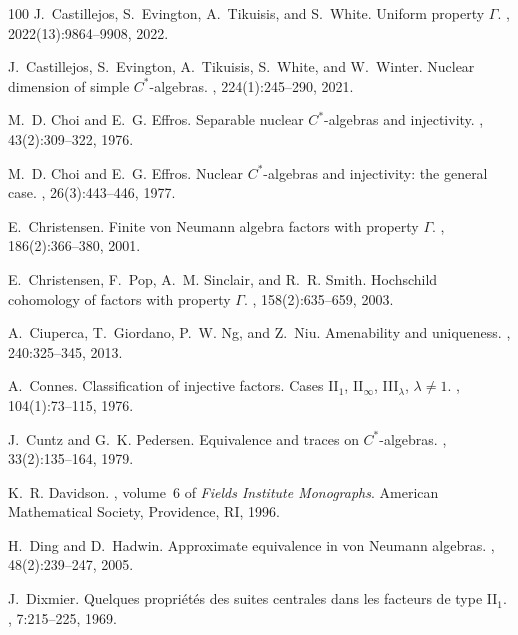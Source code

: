 \documentclass[a4paper,11pt]{amsart}
\theoremstyle{definition}
\numberwithin{equation}{section}
\numberwithin{theorem}{section}
\begin{document}
\begin{thebibliography}{100}
J.~Castillejos, S.~Evington, A.~Tikuisis, and S.~White.
\newblock Uniform property {$\Gamma$}.
, 2022(13):9864--9908, 2022.

J.~Castillejos, S.~Evington, A.~Tikuisis, S.~White, and W.~Winter.
\newblock Nuclear dimension of simple {$C^*$}-algebras.
, 224(1):245--290, 2021.

M.~D. Choi and E.~G. Effros.
\newblock Separable nuclear {$C^*$}-algebras and injectivity.
, 43(2):309--322, 1976.

M.~D. Choi and E.~G. Effros.
\newblock Nuclear {$C^*$}-algebras and injectivity: the general case.
, 26(3):443--446, 1977.

E.~Christensen.
\newblock Finite von {N}eumann algebra factors with property {$\Gamma$}.
, 186(2):366--380, 2001.

E.~Christensen, F.~Pop, A.~M. Sinclair, and R.~R. Smith.
\newblock Hochschild cohomology of factors with property {$\Gamma$}.
, 158(2):635--659, 2003.

A.~Ciuperca, T.~Giordano, P.~W. Ng, and Z.~Niu.
\newblock Amenability and uniqueness.
, 240:325--345, 2013.

A.~Connes.
\newblock Classification of injective factors. {C}ases {II$_{1}$,} {II$_{\infty
  }$,} {III$_{\lambda }$,} {$\lambda \not=1$}.
, 104(1):73--115, 1976.

J.~Cuntz and G.~K. Pedersen.
\newblock Equivalence and traces on {$C^*$}-algebras.
, 33(2):135--164, 1979.

K.~R. Davidson.
, volume~6 of {\em Fields Institute
  Monographs}.
\newblock American Mathematical Society, Providence, RI, 1996.

H.~Ding and D.~Hadwin.
\newblock Approximate equivalence in von {N}eumann algebras.
, 48(2):239--247, 2005.

J.~Dixmier.
\newblock Quelques propri\'et\'es des suites centrales dans les facteurs de
  type {II}$_{1}$.
, 7:215--225, 1969.


\end{thebibliography}
\end{document}
